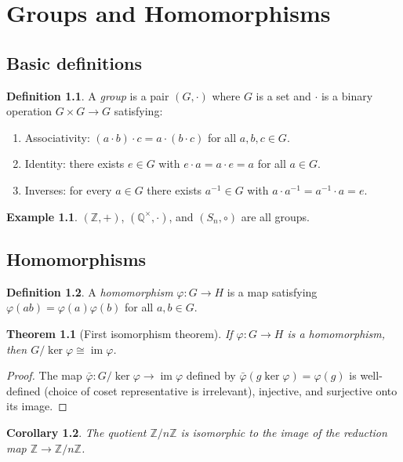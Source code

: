 \documentclass{book}
\newtheorem{theorem}{Theorem}[chapter]
\newtheorem{corollary}[theorem]{Corollary}
\theoremstyle{definition}
\newtheorem{definition}{Definition}[chapter]
\newtheorem{example}{Example}[chapter]
\begin{document}
\chapter{Groups and Homomorphisms}

\section{Basic definitions}

\begin{definition}
A \emph{group} is a pair $(G, \cdot)$ where $G$ is a set and $\cdot$ is a binary operation $G \times G \to G$ satisfying:
\begin{enumerate}
  \item Associativity: $(a \cdot b) \cdot c = a \cdot (b \cdot c)$ for all $a, b, c \in G$.
  \item Identity: there exists $e \in G$ with $e \cdot a = a \cdot e = a$ for all $a \in G$.
  \item Inverses: for every $a \in G$ there exists $a^{-1} \in G$ with $a \cdot a^{-1} = a^{-1} \cdot a = e$.
\end{enumerate}
\end{definition}

\begin{example}
$(\mathbb{Z}, +)$, $(\mathbb{Q}^\times, \cdot)$, and $(S_n, \circ)$ are all groups.
\end{example}

\section{Homomorphisms}

\begin{definition}
A \emph{homomorphism} $\varphi: G \to H$ is a map satisfying $\varphi(ab) = \varphi(a)\varphi(b)$ for all $a, b \in G$.
\end{definition}

\begin{theorem}[First isomorphism theorem]
If $\varphi: G \to H$ is a homomorphism, then $G/\ker\varphi \cong \operatorname{im}\varphi$.
\end{theorem}

\begin{proof}
The map $\bar\varphi: G/\ker\varphi \to \operatorname{im}\varphi$ defined by $\bar\varphi(g\ker\varphi) = \varphi(g)$ is well-defined (choice of coset representative is irrelevant), injective, and surjective onto its image.
\end{proof}

\begin{corollary}
The quotient $\mathbb{Z}/n\mathbb{Z}$ is isomorphic to the image of the reduction map $\mathbb{Z} \to \mathbb{Z}/n\mathbb{Z}$.
\end{corollary}
\end{document}
